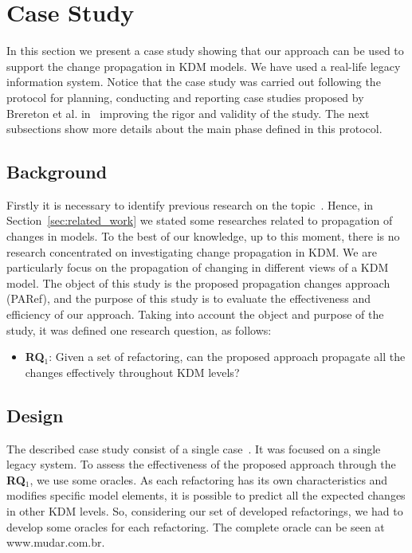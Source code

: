 
\section{Case Study}\label{sec:case_study}

In this section we present a case study showing that our approach can be used to support the change propagation in KDM models. We have used a real-life legacy information system. 
Notice that the case study was carried out following the protocol for planning, conducting and reporting case studies proposed by Brereton et al. in~\cite{Brereton:2008} improving the rigor and validity of the study. The next subsections show more details about the main phase defined in this protocol.

\subsection{Background}

Firstly it is necessary to identify previous research on the topic~\cite{Brereton:2008}. Hence, in Section~\ref{sec:related_work} we stated some researches related to propagation of changes in models. To the best of our knowledge, up to this moment, there is no research concentrated on investigating change propagation in KDM. We are particularly focus on the propagation of changing in different views of a KDM model. The object of this study is the proposed propagation changes approach (PARef), and the purpose of this study is to evaluate the  effectiveness and efficiency of our approach. Taking into account the object and purpose of the study, it was defined one research question, as follows:

\begin{itemize}
\item \textbf{RQ$_1$}: Given a set of refactoring, can the proposed approach propagate all the changes effectively throughout KDM levels?
\end{itemize}


\subsection{Design}

The described case study consist of a single case~\cite{Brereton:2008}. It was focused on a single legacy system. To assess the effectiveness of the proposed approach through the \textbf{RQ$_1$}, we use some oracles. As each refactoring has its own characteristics and modifies specific model elements, it is possible to predict all the expected changes in other KDM levels. So, considering our set of developed refactorings, we had to develop some oracles for each refactoring. The complete oracle can be seen at www.mudar.com.br.

